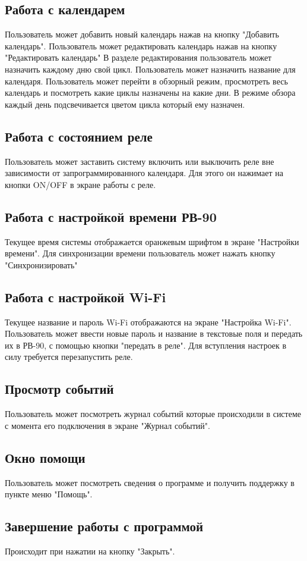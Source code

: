 \subsection{Работа с календарем}
Пользователь может добавить новый календарь нажав на кнопку "Добавить календарь".
Пользователь может редактировать календарь нажав на кнопку "Редактировать календарь"
В разделе редактирования пользователь может назначить каждому дню свой цикл.
Пользователь может назначить название для календаря.
Пользователь может перейти в обзорный режим, просмотреть весь календарь и посмотреть какие циклы назначены на какие дни. В режиме обзора каждый день подсвечивается цветом цикла который ему назначен. 

\subsection{Работа с состоянием реле}
Пользователь может заставить систему включить или выключить реле вне зависимости от запрограммированного календаря. Для этого он нажимает на кнопки ON/OFF в экране работы с реле.

\subsection{Работа с настройкой времени РВ-90}
Текущее время системы отображается оранжевым шрифтом в экране "Настройки времени".
Для синхронизации времени пользователь может нажать кнопку "Синхронизировать"

\subsection{Работа с настройкой Wi-Fi}
Текущее название и пароль Wi-Fi отображаются на экране "Настройка Wi-Fi".
Пользователь может ввести новые пароль и название в текстовые поля и передать их 
в РВ-90, с помощью кнопки "передать в реле". Для вступления настроек в силу требуется перезапустить реле.

\subsection{Просмотр событий}
Пользователь может посмотреть журнал событий которые происходили в системе с момента его подключения в экране "Журнал событий".

\subsection{Окно помощи}
Пользователь может посмотреть сведения о программе и получить поддержку в пункте меню "Помощь".

\subsection{Завершение работы с программой}
Происходит при нажатии на кнопку "Закрыть".

